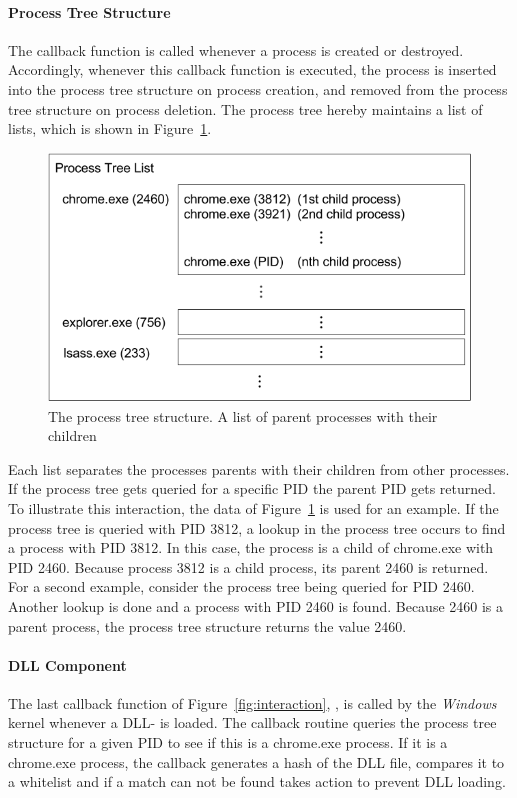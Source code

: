 \paragraph{Process Tree Structure}
The  callback function is called whenever a process is created or destroyed. Accordingly, whenever this callback function is executed, the process is inserted into the process tree structure on process creation, and removed from the process tree structure on process deletion. The process tree hereby maintains a list of lists, which is shown in Figure~\ref{fig:listoflists}.
\begin{figure}[h]
\centering
\includegraphics[scale=0.6]{sections/implementation/listoflists.png}
\caption{The process tree structure. A list of parent processes with their children}
\label{fig:listoflists}
\end{figure}
Each list separates the processes parents with their children from other processes. If the process tree gets queried for a specific \gls{PID} the parent \gls{PID} gets returned. To illustrate this interaction, the data of Figure~\ref{fig:listoflists} is used for an example. If the process tree is queried with \gls{PID} 3812, a lookup in the process tree occurs to find a process with \gls{PID} 3812. In this case, the process is a child of chrome.exe with \gls{PID} 2460.
Because process 3812 is a child process, its parent 2460 is returned. For a second example, consider the process tree being queried for \gls{PID} 2460. Another lookup is done and a process with \gls{PID} 2460 is found. Because 2460 is a parent process, the process tree structure returns the value 2460.

\paragraph{DLL Component}
The last callback function of Figure~\ref{fig:interaction}, , is called by the \emph{Windows} kernel whenever a \gls{DLL}- is loaded. The callback routine queries the process tree structure for a given \gls{PID} to see if this is a chrome.exe process. If it is a chrome.exe process, the callback generates a hash of the \gls{DLL} file, compares it to a whitelist and if a match can not be found takes action to prevent \gls{DLL} loading.

